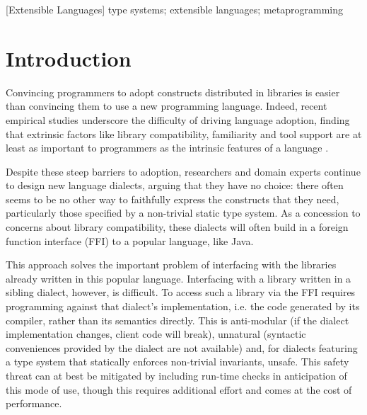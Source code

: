 \documentclass{sigplanconf}
\begin{document}
[Extensible Languages]
\keywords
type systems; extensible languages; metaprogramming
\section{Introduction}\label{intro}
Convincing programmers to adopt constructs distributed in libraries is easier than con\-vinc\-ing them to use a new programming language. Indeed, re\-cent empirical studies underscore the  difficulty of driving language adoption, finding that extrinsic factors like library compatibility, familiarity and tool support are at least as important to programmers as the intrinsic features of a language \cite{Meyerovich:2013:EAP:2509136.2509515,chen05}. 

Despite these steep barriers to adoption, researchers and domain experts continue to design new language dialects, arguing that they have no choice: there often seems to be no other way to faithfully express the constructs that they need, particularly those  specified by a non-trivial static type system. As a concession to concerns about library compatibility, these dialects will often build in a foreign function interface (FFI) to a popular language, like Java. %

This approach solves the important problem of interfacing with the libraries already written in  this popular language. Interfacing with a library written in a sibling  dialect, however, is difficult. To access such a library via the FFI requires programming against that dialect's implementation, i.e. the code generated by its compiler, rather than its semantics directly. This is anti-modular (if the dialect implementation changes, client code will break), unnatural (syntactic conveniences provided by the dialect are not available) and, for  dialects featuring a type system that statically enforces non-trivial invariants, unsafe. This safety threat can at best be mitigated by including run-time checks in anticipation of this mode of use, though this requires additional effort and comes at the cost of performance.%
\end{document}
